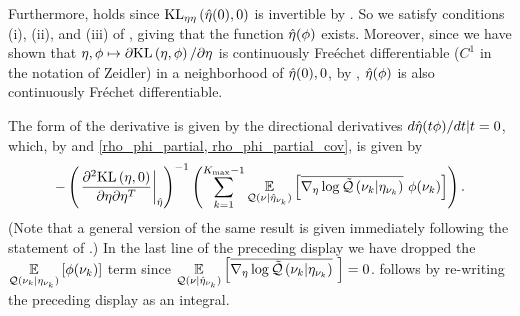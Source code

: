 %




Furthermore, \citet[Chapter 4 Condition
21b]{zeidler:2013:functional} holds since $\mathrm{KL}_{\eta\eta}\left(\hat\eta(0), 0\right)$ is
invertible by .   So we satisfy conditions (i),
(ii), and (iii) of \citet[Theorem 4.B(c)]{zeidler:2013:functional}, giving that
the function $\hat\eta(\phi)$ exists.  Moreover, since we have shown that $\eta,
\phi \mapsto \partial \mathrm{KL}\left(\eta, \phi\right) / \partial \eta$ is continuously
Fre{\'e}chet differentiable ($C^1$ in the notation of Zeidler) in a neighborhood
of $\hat\eta(0), 0$, by \citet[Theorem 4.B(d)]{zeidler:2013:functional},
$\hat\eta(\phi)$ is also continuously Fr{\'e}chet differentiable.

The form of the derivative is given by the directional derivatives $d \hat\eta(t
\phi) / dt | t = 0$, which, by  and \eqref{rho_phi_partial,
rho_phi_partial_cov}, is given by
%
\begin{align*}
%
-\left(\fracat{\partial^2 \KL{\eta, \phiz}}
                {\partial \eta \partial \eta^T}
                {\etaopt}\right)^{-1}
\left(
    \sumkm \expect{\q(\nu \vert \etaoptnuk)}
                  {\lqgradbar{\nuk \vert \etanuk}
                   \phi(\nuk) }
\right).
%
\end{align*}
%
(Note that a general version of the same result is given immediately following
the statement of \citet[Theorem 4.B(c)]{zeidler:2013:functional}.)  In the last
line of the preceding display we have dropped the $\underset{\mathcal{Q}(\nu_{k} \vert
\eta_{\nu_{k}})}{\mathbb{E}}\left[\phi(\nu_{k})\right]$ term since $\underset{\mathcal{Q}(\nu \vert \hat\eta_{\nu_{k}})}{\mathbb{E}}\left[\overline{{\nabla_\eta \log \tilde{\mathcal{Q}}}\left(\nu_{k} \vert \eta_{\nu_{k}}\right)}\,\,\right] = 0$.   follows by
re-writing the preceding display as an integral.
%




